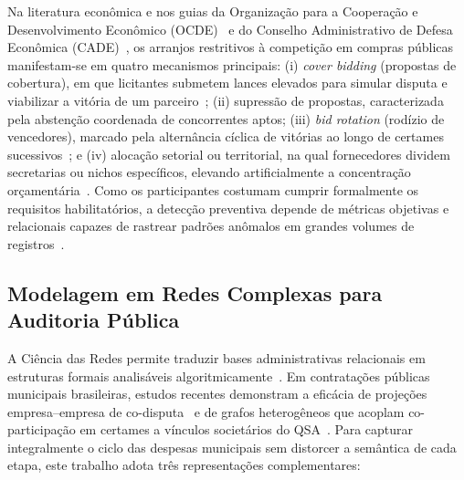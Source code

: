Na literatura econômica e nos guias da Organização para a Cooperação e Desenvolvimento Econômico (OCDE)~\cite{oecd2025guidelines} e do Conselho Administrativo de Defesa Econômica (CADE)~\cite{cade2019guia}, os arranjos restritivos à competição em compras públicas manifestam-se em quatro mecanismos principais: (i) \textit{cover bidding} (propostas de cobertura), em que licitantes submetem lances elevados para simular disputa e viabilizar a vitória de um parceiro~\cite{carbone2024bidrigging,aaltio2025complementary}; (ii) supressão de propostas, caracterizada pela abstenção coordenada de concorrentes aptos; (iii) \textit{bid rotation} (rodízio de vencedores), marcado pela alternância cíclica de vitórias ao longo de certames sucessivos~\cite{imhof2018screening,imhof2021detecting}; e (iv) alocação setorial ou territorial, na qual fornecedores dividem secretarias ou nichos específicos, elevando artificialmente a concentração orçamentária~\cite{wachs2019cartel,wachs2020corruption}. Como os participantes costumam cumprir formalmente os requisitos habilitatórios, a detecção preventiva depende de métricas objetivas e relacionais capazes de rastrear padrões anômalos em grandes volumes de registros~\cite{fazekas2016objective}.

\subsection{Modelagem em Redes Complexas para Auditoria Pública}

A Ciência das Redes permite traduzir bases administrativas relacionais em estruturas formais analisáveis algoritmicamente~\cite{newman2018networks}. Em contratações públicas municipais brasileiras, estudos recentes demonstram a eficácia de projeções empresa--empresa de co-disputa~\cite{lyra2021characterization} e de grafos heterogêneos que acoplam co-participação em certames a vínculos societários do QSA~\cite{villamil2024collusion,pompeu2025collusion}. Para capturar integralmente o ciclo das despesas municipais sem distorcer a semântica de cada etapa, este trabalho adota três representações complementares:

